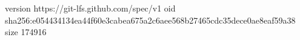 version https://git-lfs.github.com/spec/v1
oid sha256:e054434134ea44f60e3cabea675a2c6aee568b27465cdc35dece0ae8eaf59a38
size 174916
